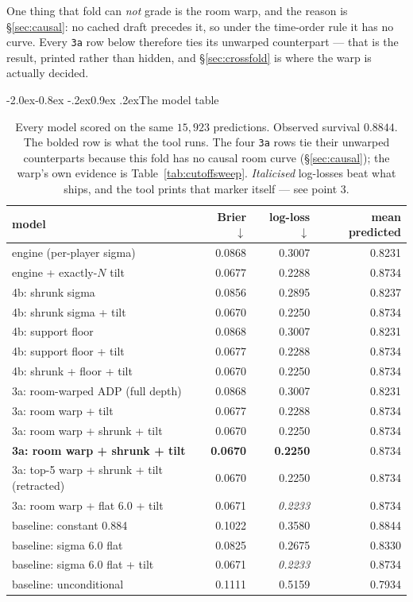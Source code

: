 \documentclass[10pt,a4paper]{article}
\makeatletter
\theoremstyle{plain}
\theoremstyle{definition}
\theoremstyle{remark}
\newcommand{\code}[1]{\texttt{\small #1}}
\renewcommand\subsection{\@startsection{subsection}{2}{\z@}%
  {-2.0ex\@plus -0.8ex \@minus -.2ex}{0.9ex \@plus .2ex}{\normalfont\large\bfseries}}
\makeatother
\begin{document}
One thing that fold can \emph{not} grade is the room warp, and the reason is
\S\ref{sec:causal}: no cached draft precedes it, so under the time-order rule it has no
curve. Every \code{3a} row below therefore ties its unwarped counterpart --- that is the
result, printed rather than hidden, and \S\ref{sec:crossfold} is where the warp is actually
decided.

\subsection{The model table}

\begin{table}[htbp]
\centering
\small
\begin{tabular}{lrrr}
\toprule
model & Brier $\downarrow$ & log-loss $\downarrow$ & mean predicted \\
\midrule
engine (per-player sigma)              & 0.0868 & 0.3007 & 0.8231 \\
engine + exactly-$N$ tilt              & 0.0677 & 0.2288 & 0.8734 \\
\midrule
4b: shrunk sigma                       & 0.0856 & 0.2895 & 0.8237 \\
4b: shrunk sigma + tilt                & 0.0670 & 0.2250 & 0.8734 \\
4b: support floor                      & 0.0868 & 0.3007 & 0.8231 \\
4b: support floor + tilt               & 0.0677 & 0.2288 & 0.8734 \\
4b: shrunk + floor + tilt              & 0.0670 & 0.2250 & 0.8734 \\
\midrule
3a: room-warped ADP (full depth)       & 0.0868 & 0.3007 & 0.8231 \\
3a: room warp + tilt                   & 0.0677 & 0.2288 & 0.8734 \\
3a: room warp + shrunk + tilt          & 0.0670 & 0.2250 & 0.8734 \\
\textbf{3a: room warp + shrunk + tilt} & \textbf{0.0670} & \textbf{0.2250} & 0.8734 \\
3a: top-5 warp + shrunk + tilt (retracted) & 0.0670 & 0.2250 & 0.8734 \\
3a: room warp + flat 6.0 + tilt        & 0.0671 & \emph{0.2233} & 0.8734 \\
\midrule
baseline: constant 0.884               & 0.1022 & 0.3580 & 0.8844 \\
baseline: sigma 6.0 flat               & 0.0825 & 0.2675 & 0.8330 \\
baseline: sigma 6.0 flat + tilt        & 0.0671 & \emph{0.2233} & 0.8734 \\
baseline: unconditional                & 0.1111 & 0.5159 & 0.7934 \\
\bottomrule
\end{tabular}
\caption{Every model scored on the same $15{,}923$ predictions. Observed survival
$0.8844$. The bolded row is what the tool runs. The four \code{3a} rows tie their unwarped
counterparts because this fold has no causal room curve (\S\ref{sec:causal}); the warp's own
evidence is Table~\ref{tab:cutoffsweep}. \emph{Italicised} log-losses beat what ships, and
the tool prints that marker itself --- see point 3.}
\label{tab:models}
\end{table}
\end{document}

